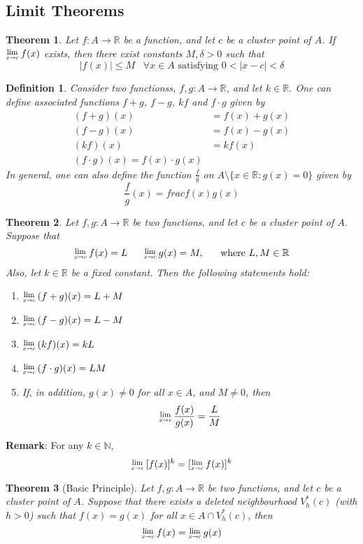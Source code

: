 \documentclass[8pt]{article}
\newcommand{\Lim}[1]{\raisebox{0.5ex}{\scalebox{0.8}{$\displaystyle \lim_{#1}\;$}}}
\newtheorem{definition}{Definition}[section]
\newtheorem{theorem}{Theorem}[section]
\theoremstyle{definition}
\begin{document}
\subsection{Limit Theorems}
\begin{theorem}\normalfont Let $f:A\to \mathbb{R}$ be a function, and let $c$ be a cluster point of $A$. If $\Lim{x\to c}f(x)$ exists, then there exist constants $M,\delta>0$ such that
\[
|f(x)|\leq M\;\;\;\forall x\in A\text{ satisfying }0<|x-c|<\delta
\] 
\end{theorem}
\begin{definition}\normalfont Consider two functionss, $f,g:A\to\mathbb{R}$, and let $k\in\mathbb{R}$. One can define associated functions $f+g$, $f-g$, $kf$ and $f\cdot g$ given by
\[
\begin{aligned}
(f+g)(x)&=f(x)+g(x)\\
(f-g)(x)&=f(x)-g(x)\\
(kf)(x)&=kf(x)\\
(f\cdot g)(x)=f(x)\cdot g(x)
\end{aligned}
\]
In general, one can also define the function $\frac{f}{g}$ on $A\setminus\{x\in\mathbb{R}:g(x)=0\}$ given by
\[
\frac{f}{g}(x)=frac{f(x)}{g(x)}
\]
\end{definition}
\begin{theorem}\normalfont Let $f,g:A\to\mathbb{R}$ be two functions, and let $c$ be a cluster point of $A$. Suppose that
\[
\Lim{x\to c}f(x)=L\;\;\;\;\;\;\Lim{x\to c}g(x)=M,\;\;\;\;\;\;\text{where }L,M\in\mathbb{R}
\]
Also, let $k\in\mathbb{R}$ be a fixed constant. Then the following statements hold:
\begin{enumerate}
\item $\Lim{x\to c}(f+g)(x)=L+M$
\item $\Lim{x\to c}(f-g)(x)=L-M$
\item $\Lim{x\to c}(kf)(x)=kL$
\item $\Lim{x\to c}(f\cdot g)(x)=LM$
\item If, in addition, $g(x)\neq 0$ for all $x\in A$, and $M\neq 0$, then
\[
\Lim{x\to c}\frac{f(x)}{g(x)}=\frac{L}{M}
\]
\end{enumerate}
\end{theorem}
\textbf{Remark}: For any $k\in\mathbb{N}$,
\[
\Lim{x\to c}[f(x)]^k=[\Lim{x\to c}f(x)]^k
\]
\begin{theorem}[Basic Principle]
\normalfont Let $f,g: A\to \mathbb{R}$ be two functions, and let $c$ be a cluster point of $A$. Suppose that there exists a deleted neighbourhood $V_h^\ast(c)$ (with $h>0$) such that $f(x)=g(x)$ for all $x\in A\cap V_h^\ast (c)$, then
\[
\Lim{x\to c}f(x)=\Lim{x\to c}g(x)
\]
\end{theorem}
\end{document}
